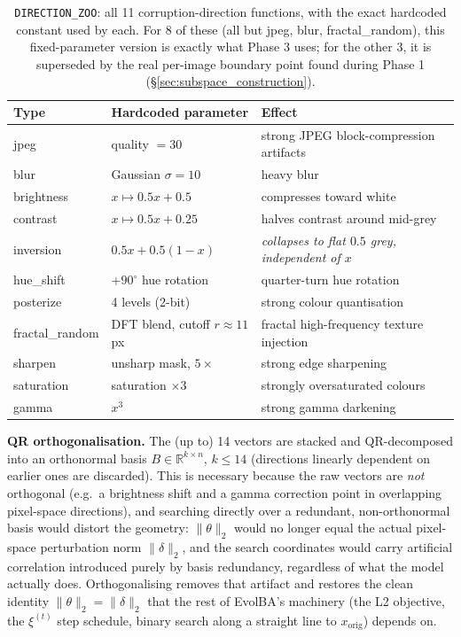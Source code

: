 \documentclass[11pt, a4paper]{article}
\begin{document}
\begin{table}[htbp]
\centering
\caption{\texttt{DIRECTION\_ZOO}: all 11 corruption-direction functions, with the exact hardcoded constant used by each. For 8 of these (all but jpeg, blur, fractal\_random), this fixed-parameter version is exactly what Phase 3 uses; for the other 3, it is superseded by the real per-image boundary point found during Phase 1 (\S\ref{sec:subspace_construction}).}
\label{tab:direction_zoo}
\begin{tabular}{lll}
\toprule
Type & Hardcoded parameter & Effect \\
\midrule
jpeg & quality $=30$ & strong JPEG block-compression artifacts \\
blur & Gaussian $\sigma=10$ & heavy blur \\
brightness & $x\mapsto 0.5x+0.5$ & compresses toward white \\
contrast & $x\mapsto 0.5x+0.25$ & halves contrast around mid-grey \\
inversion & $0.5x+0.5(1-x)$ & \emph{collapses to flat $0.5$ grey, independent of $x$} \\
hue\_shift & $+90^\circ$ hue rotation & quarter-turn hue rotation \\
posterize & 4 levels (2-bit) & strong colour quantisation \\
fractal\_random & DFT blend, cutoff $r\approx11$px & fractal high-frequency texture injection \\
sharpen & unsharp mask, $5\times$ & strong edge sharpening \\
saturation & saturation $\times3$ & strongly oversaturated colours \\
gamma & $x^{3}$ & strong gamma darkening \\
\bottomrule
\end{tabular}
\end{table}

\textbf{QR orthogonalisation.} The (up to) 14 vectors are stacked and QR-decomposed into an orthonormal basis $B\in\mathbb{R}^{k\times n}$, $k\leq14$ (directions linearly dependent on earlier ones are discarded). This is necessary because the raw vectors are \emph{not} orthogonal (e.g.\ a brightness shift and a gamma correction point in overlapping pixel-space directions), and searching directly over a redundant, non-orthonormal basis would distort the geometry: $\|\theta\|_2$ would no longer equal the actual pixel-space perturbation norm $\|\delta\|_2$, and the search coordinates would carry artificial correlation introduced purely by basis redundancy, regardless of what the model actually does. Orthogonalising removes that artifact and restores the clean identity $\|\theta\|_2=\|\delta\|_2$ that the rest of EvolBA's machinery (the L2 objective, the $\xi^{(t)}$ step schedule, binary search along a straight line to $x_{\mathrm{orig}}$) depends on.
\end{document}
